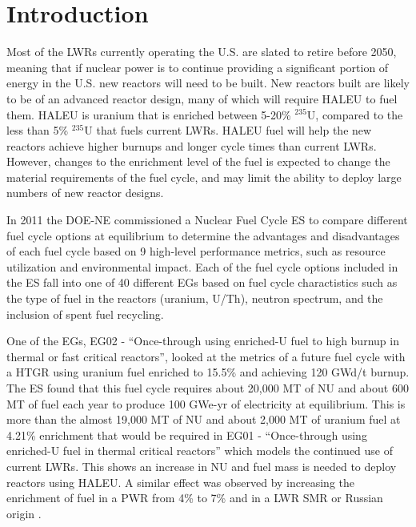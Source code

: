 \section{Introduction}

Most of the \glspl{LWR} currently operating the U.S. are slated to retire
before 2050, meaning that if nuclear power is to continue providing a 
significant portion of energy in the U.S. new reactors will need to be built. 
New reactors built are likely to be of an advanced reactor design, many of 
which will require \gls{HALEU} to fuel them. \gls{HALEU} is uranium that 
is enriched between 5-20\% $^{235}$U, compared to the less than 5\% $^{235}$U 
that fuels current \glspl{LWR}. \gls{HALEU} fuel will help 
the new reactors achieve higher burnups and longer cycle times than current 
\glspl{LWR}. However, changes to the enrichment level of the fuel is expected 
to change the material requirements of the fuel cycle, and may limit the 
ability to deploy large numbers of new reactor designs. 

In 2011 the \gls{DOE-NE} commissioned a Nuclear Fuel Cycle \gls{ES} 
\cite{wigeland_nuclear_2014} to compare different fuel cycle options at 
equilibrium to determine the advantages and disadvantages of each fuel cycle 
based on 9 high-level performance metrics, such as resource utilization and 
environmental impact. Each of the fuel cycle options included in the 
\gls{ES} fall into one of 40 different \glspl{EG} based on fuel 
cycle charactistics such as the type of fuel in the reactors (uranium, 
U/Th), neutron spectrum, and the inclusion of spent fuel recycling. 

One of the \glspl{EG}, \gls{EG}02 - ``Once-through using enriched-U fuel to 
high burnup in thermal or fast critical reactors'', looked at the metrics 
of a future fuel cycle with a \gls{HTGR} using uranium fuel enriched to 
15.5\% and achieving 120 GWd/t burnup. The \gls{ES} found that this fuel cycle
requires about 20,000 MT of \gls{NU} and about 600 MT of fuel each year 
to produce 100 GWe-yr of electricity at equilibrium. This is more than the 
almost 19,000 MT of \gls{NU} and about 2,000 MT of uranium fuel at 4.21\%
enrichment that would be required in \gls{EG}01 - ``Once-through using enriched-U 
fuel in thermal critical reactors'' which models the continued use of current 
\glspl{LWR}. This shows an increase in \gls{NU} and fuel mass is needed to 
deploy reactors using \gls{HALEU}.
A similar effect was observed by increasing the enrichment of fuel in a 
\gls{PWR} from 4\% to 7\% \cite{burns_reactor_2020} and in a \gls{LWR}
\gls{SMR} or Russian origin \cite{hernandez_potential_2020}. 

